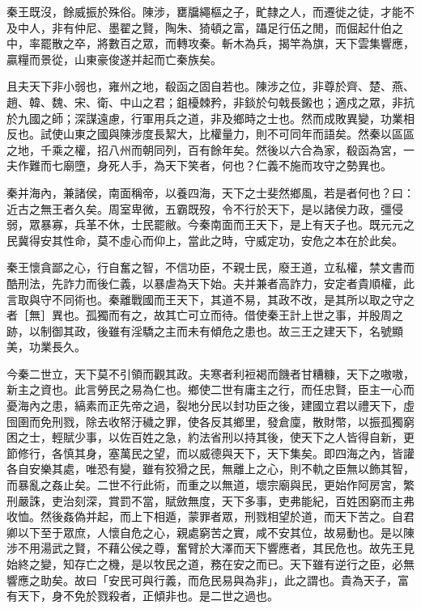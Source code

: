 \begin{pinyinscope}
秦王既沒，餘威振於殊俗。陳涉，罋牖繩樞之子，甿隸之人，而遷徙之徒，才能不及中人，非有仲尼、墨翟之賢，陶朱、猗頓之富，躡足行伍之閒，而倔起什伯之中，率罷散之卒，將數百之眾，而轉攻秦。斬木為兵，揭竿為旗，天下雲集響應，贏糧而景從，山東豪俊遂并起而亡秦族矣。

且夫天下非小弱也，雍州之地，殽函之固自若也。陳涉之位，非尊於齊、楚、燕、趙、韓、魏、宋、衛、中山之君；鉏櫌棘矜，非錟於句戟長鎩也；適戍之眾，非抗於九國之師；深謀遠慮，行軍用兵之道，非及鄉時之士也。然而成敗異變，功業相反也。試使山東之國與陳涉度長絜大，比權量力，則不可同年而語矣。然秦以區區之地，千乘之權，招八州而朝同列，百有餘年矣。然後以六合為家，殽函為宮，一夫作難而七廟墮，身死人手，為天下笑者，何也？仁義不施而攻守之勢異也。

秦并海內，兼諸侯，南面稱帝，以養四海，天下之士斐然鄉風，若是者何也？曰：近古之無王者久矣。周室卑微，五霸既歿，令不行於天下，是以諸侯力政，彊侵弱，眾暴寡，兵革不休，士民罷敝。今秦南面而王天下，是上有天子也。既元元之民冀得安其性命，莫不虛心而仰上，當此之時，守威定功，安危之本在於此矣。

秦王懷貪鄙之心，行自奮之智，不信功臣，不親士民，廢王道，立私權，禁文書而酷刑法，先詐力而後仁義，以暴虐為天下始。夫并兼者高詐力，安定者貴順權，此言取與守不同術也。秦離戰國而王天下，其道不易，其政不改，是其所以取之守之者［無］異也。孤獨而有之，故其亡可立而待。借使秦王計上世之事，并殷周之跡，以制御其政，後雖有淫驕之主而未有傾危之患也。故三王之建天下，名號顯美，功業長久。

今秦二世立，天下莫不引領而觀其政。夫寒者利裋褐而饑者甘糟糠，天下之嗷嗷，新主之資也。此言勞民之易為仁也。鄉使二世有庸主之行，而任忠賢，臣主一心而憂海內之患，縞素而正先帝之過，裂地分民以封功臣之後，建國立君以禮天下，虛囹圉而免刑戮，除去收帑汙穢之罪，使各反其鄉里，發倉廩，散財幣，以振孤獨窮困之士，輕賦少事，以佐百姓之急，約法省刑以持其後，使天下之人皆得自新，更節修行，各慎其身，塞萬民之望，而以威德與天下，天下集矣。即四海之內，皆讙各自安樂其處，唯恐有變，雖有狡猾之民，無離上之心，則不軌之臣無以飾其智，而暴亂之姦止矣。二世不行此術，而重之以無道，壞宗廟與民，更始作阿房宮，繁刑嚴誅，吏治刻深，賞罰不當，賦斂無度，天下多事，吏弗能紀，百姓困窮而主弗收恤。然後姦偽并起，而上下相遁，蒙罪者眾，刑戮相望於道，而天下苦之。自君卿以下至于眾庶，人懷自危之心，親處窮苦之實，咸不安其位，故易動也。是以陳涉不用湯武之賢，不藉公侯之尊，奮臂於大澤而天下響應者，其民危也。故先王見始終之變，知存亡之機，是以牧民之道，務在安之而已。天下雖有逆行之臣，必無響應之助矣。故曰「安民可與行義，而危民易與為非」，此之謂也。貴為天子，富有天下，身不免於戮殺者，正傾非也。是二世之過也。


\end{pinyinscope}
